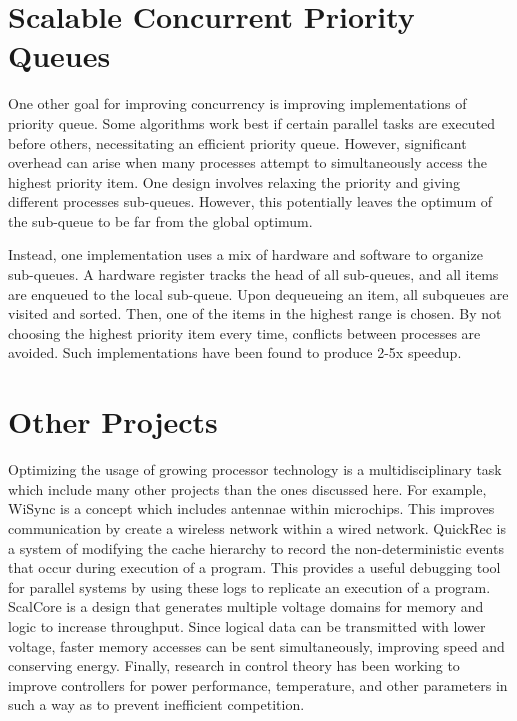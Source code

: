 \documentclass[twoside]{article}
\begin{document}
\section{Scalable Concurrent Priority Queues}

One other goal for improving concurrency is improving implementations of priority queue. Some algorithms work best if certain parallel tasks are executed before others, necessitating an efficient priority queue. However, significant overhead can arise when many processes attempt to simultaneously access the highest priority item. One design involves relaxing the priority and giving different processes sub-queues. However, this potentially leaves the optimum of the sub-queue to be far from the global optimum.

Instead, one implementation uses a mix of hardware and software to organize sub-queues. A hardware register tracks the head of all sub-queues, and all items are enqueued to the local sub-queue. Upon dequeueing an item, all subqueues are visited and sorted. Then, one of the items in the highest range is chosen. By not choosing the highest priority item every time, conflicts between processes are avoided. Such implementations have been found to produce 2-5x speedup.

\section{Other Projects}

Optimizing the usage of growing processor technology is a multidisciplinary task which include many other projects than the ones discussed here. For example, WiSync is a concept which includes antennae within microchips. This improves communication by create a wireless network within a wired network. QuickRec is a system of modifying the cache hierarchy to record the non-deterministic events that occur during execution of a program. This provides a useful debugging tool for parallel systems by using these logs to replicate an execution of a program. ScalCore is a design that generates multiple voltage domains for memory and logic to increase throughput. Since logical data can be transmitted with lower voltage, faster memory accesses can be sent simultaneously, improving speed and conserving energy. Finally, research in control theory has been working to improve controllers for power performance, temperature, and other parameters in such a way as to prevent inefficient competition. 
\end{document}
